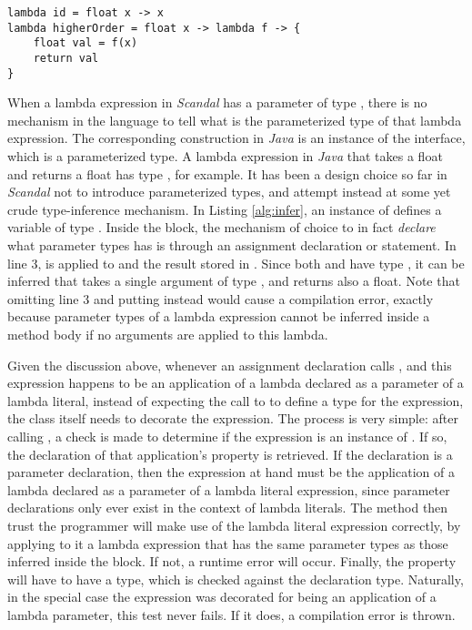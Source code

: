 \begin{lstlisting}[emph={lambda,float,return},emphstyle={\textbf},caption={Type inference in \emph{Scandal}.},label={alg:infer}]
lambda id = float x -> x
lambda higherOrder = float x -> lambda f -> {
	float val = f(x)
	return val
}
\end{lstlisting}

When a lambda expression in \emph{Scandal} has a parameter of type , there is no mechanism in the language to tell what is the parameterized type of that lambda expression. The corresponding construction in \emph{Java} is an instance of the  interface, which is a parameterized type. A lambda expression in \emph{Java} that takes a float and returns a float has type , for example. It has been a design choice so far in \emph{Scandal} not to introduce parameterized types, and attempt instead at some yet crude type-inference mechanism. In Listing \ref{alg:infer}, an instance of  defines a variable  of type . Inside the block, the mechanism of choice to in fact \emph{declare} what parameter types  has is through an assignment declaration or statement. In line 3,  is applied to  and the result stored in . Since both  and  have type , it can be inferred that  takes a single argument of type , and returns also a float. Note that omitting line 3 and putting  instead would cause a compilation error, exactly because parameter types of a lambda expression cannot be inferred inside a method body if no arguments are applied to this lambda.

Given the discussion above, whenever an assignment declaration calls , and this expression happens to be an application of a lambda declared as a parameter of a lambda literal, instead of expecting the call to  to define a type for the expression, the  class itself needs to decorate the expression. The process is very simple: after calling , a check is made to determine if the expression is an instance of . If so, the declaration of that application's  property is retrieved. If the declaration is a parameter declaration, then the expression at hand must be the application of a lambda declared as a parameter of a lambda literal expression, since parameter declarations only ever exist in the context of lambda literals. The  method then trust the programmer will make use of the lambda literal expression correctly, by applying to it a lambda expression that has the same parameter types as those inferred inside the block. If not, a runtime error will occur. Finally, the  property will have to have a type, which is checked against the declaration type. Naturally, in the special case the expression was decorated for being an application of a lambda parameter, this test never fails. If it does, a compilation error is thrown.

